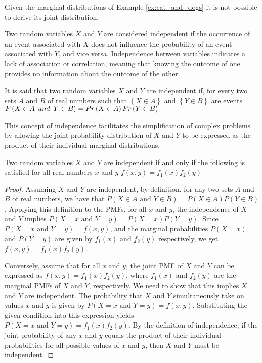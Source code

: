 \begin{example}
Given the marginal distributions of Example \ref{ex:cat_and_dogs} it is not possible to derive its joint distribution.
\end{example}

Two random variables $X$ and $Y$ are considered independent if the occurrence of an event associated with $X$ does not influence the probability of an event associated with $Y$, and vice versa. Independence between variables indicates a lack of association or correlation, meaning that knowing the outcome of one provides no information about the outcome of the other.

\begin{definition}
It is said that two random variables $X$ and $Y$ are independent if, for every two sets $A$ and $B$ of real numbers such that $\left\{ X\in A\right\}$ and $\left\{ Y\in B\right\}$ are events $P\left(X\in A\enskip and\enskip Y\in B\right)=Pr\left(X\in A\right)Pr\left(Y\in B\right)$
\end{definition}

This concept of independence facilitates the simplification of complex problems by allowing the joint probability distribution of $X$ and $Y$ to be expressed as the product of their individual marginal distributions.

\begin{proposition}
Two random variables $X$ and $Y$ are independent if and only if the following is satisfied for all real numbers $x$ and $y$ $f\left(x,y\right)=f_{1}\left(x\right)f_{2}\left(y\right)$
\end{proposition}
\begin{proof}
Assuming $X$ and $Y$ are independent, by definition, for any two sets $A$ and $B$ of real numbers, we have that $P(X \in A \text{ and } Y \in B) = P(X \in A)P(Y \in B)$. Applying this definition to the PMFs, for all $x$ and $y$, the independence of $X$ and $Y$ implies $P(X=x \text{ and } Y=y) = P(X=x)P(Y=y)$. Since $P(X=x \text{ and } Y=y) = f(x, y)$, and the marginal probabilities $P(X=x)$ and $P(Y=y)$ are given by $f_1(x)$ and $f_2(y)$ respectively, we get $f(x, y) = f_1(x)f_2(y)$.

Conversely, assume that for all $x$ and $y$, the joint PMF of $X$ and $Y$ can be expressed as $f(x, y) = f_1(x)f_2(y)$, where $f_1(x)$ and $f_2(y)$ are the marginal PMFs of $X$ and $Y$, respectively. We need to show that this implies $X$ and $Y$ are independent. The probability that $X$ and $Y$ simultaneously take on values $x$ and $y$ is given by $P(X=x \text{ and } Y=y) = f(x, y)$. Substituting the given condition into this expression yields $P(X=x \text{ and } Y=y) = f_1(x)f_2(y)$. By the definition of independence, if the joint probability of any $x$ and $y$ equals the product of their individual probabilities for all possible values of $x$ and $y$, then $X$ and $Y$ must be independent.
\end{proof}


